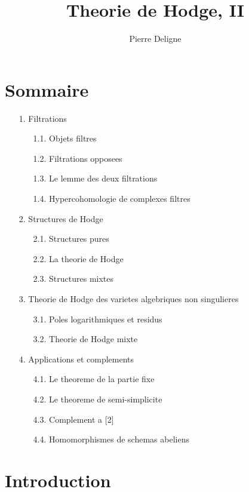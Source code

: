 \documentclass[11pt,a4paper]{amsart}
\title{Theorie de Hodge, II}
\author{Pierre Deligne}
\theoremstyle{plain}
\theoremstyle{definition}
\theoremstyle{remark}
\numberwithin{equation}{subsection}
\begin{document}
\maketitle

\section*{Sommaire}
\begin{enumerate}
\item[1.] Filtrations 
\begin{enumerate}
\item[1.1.] Objets filtres 
\item[1.2.] Filtrations opposees 
\item[1.3.] Le lemme des deux filtrations 
\item[1.4.] Hypercohomologie de complexes filtres 
\end{enumerate}
\item[2.] Structures de Hodge 
\begin{enumerate}
\item[2.1.] Structures pures 
\item[2.2.] La theorie de Hodge 
\item[2.3.] Structures mixtes 
\end{enumerate}
\item[3.] Theorie de Hodge des varietes algebriques non singulieres 
\begin{enumerate}
\item[3.1.] Poles logarithmiques et residus 
\item[3.2.] Theorie de Hodge mixte 
\end{enumerate}
\item[4.] Applications et complements 
\begin{enumerate}
\item[4.1.] Le theoreme de la partie fixe 
\item[4.2.] Le theoreme de semi-simplicite 
\item[4.3.] Complement a [2] 
\item[4.4.] Homomorphismes de schemas abeliens 
\end{enumerate}
\end{enumerate}

\section*{Introduction}
\end{document}
